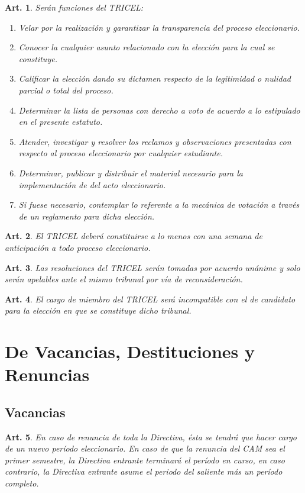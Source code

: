 \documentclass[letterpaper,11pt]{article}
\theoremstyle{plain}
\newtheorem{art}{Art.} %
\begin{document}
\begin{art}\label{TRICELFunciones}
	Serán funciones del TRICEL:
	\begin{enumerate}
		\item Velar por la realización y garantizar la transparencia del proceso eleccionario.
		\item Conocer la cualquier asunto relacionado con la elección para la cual se constituye.
		\item Calificar la elección dando su dictamen respecto de la legitimidad o nulidad parcial o total del proceso.
		\item Determinar la lista de personas con derecho a voto de acuerdo a lo estipulado en el presente estatuto.
		\item Atender, investigar y resolver los reclamos y observaciones presentadas con respecto al proceso eleccionario por cualquier estudiante.
		\item Determinar, publicar y distribuir el material necesario para la implementación de del acto eleccionario.
		\item Si fuese necesario, contemplar lo referente a la mecánica de votación a través de un reglamento para dicha elección.
	\end{enumerate}
\end{art}

\begin{art}\label{TRICELFecha}
	El TRICEL deberá constituirse a lo menos con una semana de anticipación a todo proceso eleccionario.
\end{art}

\begin{art}\label{TRICELResolucion}
	Las resoluciones del TRICEL serán tomadas por acuerdo unánime y solo serán apelables ante el mismo tribunal por vía de reconsideración.
\end{art}

\begin{art}\label{TRICELExcepciones}
	El cargo de miembro del TRICEL será incompatible con el de candidato para la elección en que se constituye dicho tribunal.
\end{art}

\section{De Vacancias, Destituciones y Renuncias}\label{vacancias}
\subsection{Vacancias}\label{vacancias}
\begin{art}\label{renunciaDirectiva}
En caso de renuncia de toda la Directiva, ésta se tendrá que hacer cargo de un nuevo período eleccionario. En caso de que la renuncia del CAM sea el primer semestre, la Directiva entrante terminará el período en curso, en caso contrario, la Directiva entrante asume el periodo del saliente más un período completo.
\end{art}
\end{document}
